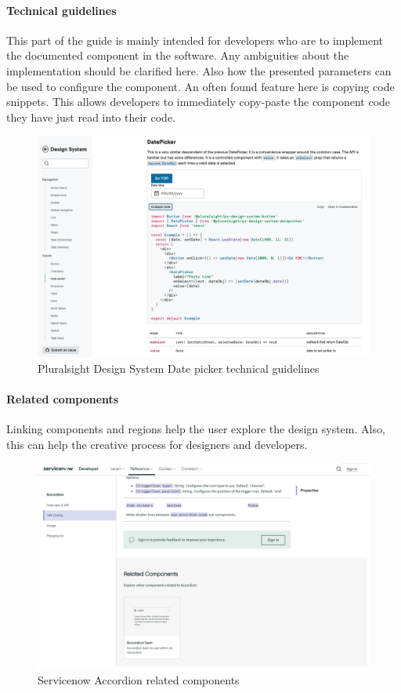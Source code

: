 \paragraph*{Technical guidelines} \label{tech_guideline}
This part of the guide is mainly intended for developers who are to implement the documented component in the software. Any ambiguities about the implementation should be clarified here. Also how the presented parameters can be used to configure the component. An often found feature here is copying code snippets. This allows developers to immediately copy-paste the component code they have just read into their code.  \cite{macdonald_practical_2019} \cite{vesselov_building_2019}
\begin{figure}[htbp]
\centerline{\includegraphics[width=\linewidth]{images/pluralsight_date-picker_technical.png}}
\caption{Pluralsight Design System Date picker technical guidelines \cite{pluralsight_datepicker_nodate}}
\label{pluralsight_date_picker}
\end{figure}
\paragraph*{Related components} Linking components and regions help the user explore the design system. Also, this can help the creative process for designers and developers.  \cite{vesselov_building_2019}
\begin{figure}[htbp]
\centerline{\includegraphics[width=\linewidth]{images/servicenow_accordion_related.png}}
\caption{Servicenow Accordion related components \cite{servicenow_now_nodate}}
\label{servicenow_accordion}
\end{figure}

